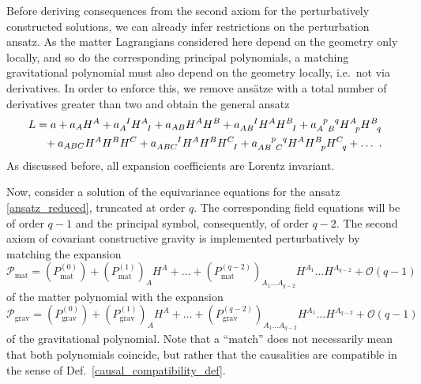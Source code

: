 Before deriving consequences from the second axiom for the perturbatively constructed solutions, we can already infer restrictions on the perturbation ansatz. As the matter Lagrangians considered here depend on the geometry only locally, and so do the corresponding principal polynomials, a matching gravitational polynomial must also depend on the geometry locally, i.e.~not via derivatives. In order to enforce this, we remove ansätze with a total number of derivatives greater than two and obtain the general ansatz
\begin{equation}\label{ansatz_reduced}
  \begin{aligned}
    L &{} = a + a_A H^A + a_A^{\hphantom AI} H^A_{\hphantom AI} + a_{AB} H^A H^B + a_{AB}^{\hphantom{AB}I} H^A H^B_{\hphantom BI} + a_{A\hphantom pB}^{\hphantom Ap\hphantom Bq} H^A_{\hphantom Ap} H^B_{\hphantom Bq} \\
      &{} \hphantom{=} + a_{ABC} H^A H^B H^C + a_{ABC}^{\hphantom{ABC}I} H^A H^B H^C_{\hphantom CI} + a_{AB\hphantom pC}^{\hphantom{AB}p\hphantom Cq} H^A H^B_{\hphantom Bp} H^C_{\hphantom Cq} + \dots \ .
  \end{aligned}
\end{equation}
As discussed before, all expansion coefficients are Lorentz invariant.

Now, consider a solution of the equivariance equations for the ansatz \eqref{ansatz_reduced}, truncated at order $q$. The corresponding field equations will be of order $q-1$ and the principal symbol, consequently, of order $q-2$. The second axiom of covariant constructive gravity is implemented perturbatively by matching the expansion
\begin{equation}\label{expansion_matter_poly}
  \mathcal P_\text{mat} = (P^{(0)}_\text{mat}) + (P^{(1)}_\text{mat})_A H^A + \dots + (P^{(q-2)}_\text{mat})_{A_1\dots A_{q-2}} H^{A_1} \dots H^{A_{q-2}} + \mathcal O(q-1)
\end{equation}
of the matter polynomial with the expansion
\begin{equation}\label{expansion_grav_poly}
  \mathcal P_\text{grav} = (P^{(0)}_\text{grav}) + (P^{(1)}_\text{grav})_A H^A + \dots + (P^{(q-2)}_\text{grav})_{A_1\dots A_{q-2}} H^{A_1} \dots H^{A_{q-2}} + \mathcal O(q-1)
\end{equation}
of the gravitational polynomial. Note that a ``match'' does not necessarily mean that both polynomials coincide, but rather that the causalities are compatible in the sense of Def.~\ref{causal_compatibility_def}.

